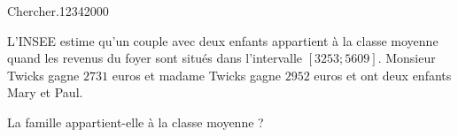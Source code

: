 {%
%

\begin{ExoDec}{Chercher.}{1234}{2}{0}{0}{0}
 
L'INSEE estime qu'un couple avec deux enfants appartient à la classe moyenne quand les revenus du foyer sont situés dans l'intervalle $[3253;5609]$. Monsieur Twicks gagne $2731$ euros et madame Twicks gagne $2952$ euros et ont deux enfants Mary et Paul.

 La famille appartient-elle à la classe moyenne ?

%
 
 \end{ExoDec}
}


